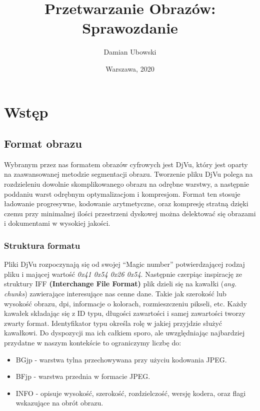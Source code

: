 \documentclass[a4paper,12pt]{book}
\title{\Large{\textbf{Przetwarzanie Obrazów: Sprawozdanie}}}
\author{
	Damian Ubowski
}
\date{Warszawa, 2020}
\begin{document}
\maketitle
\tableofcontents

\chapter{Wstęp}
\section{Format obrazu}
Wybranym przez nas formatem obrazów cyfrowych jest DjVu, który jest oparty na zaawansowanej metodzie segmentacji obrazu. Tworzenie pliku DjVu polega na rozdzieleniu dowolnie skomplikowanego obrazu na odrębne warstwy, a następnie poddaniu warst odrębnym optymalizacjom i kompresjom. Format ten stosuje ładowanie progresywne, kodowanie arytmetyczne, oraz kompresję stratną dzięki czemu przy minimalnej ilości przestrzeni dyskowej można delektować się obrazami i dokumentami w wysokiej jakości. 
\subsection{Struktura formatu}
Pliki DjVu rozpoczynają się od swojej ``Magic number'' potwierdzającej rodzaj pliku i mającej wartość \textit{0x41 0x54 0x26 0x54}. Następnie czerpiąc inspirację ze struktury IFF \textbf{(Interchange File Format)} plik dzieli się na kawałki (\textit{ang. chunks}) zawierające interesujące nas cenne dane. Takie jak szerokość lub wysokość obrazu, dpi, informacje o kolorach, rozmieszczeniu pikseli, etc. Każdy kawałek składając się z ID typu, długości zawartości i samej zawartości tworzy zwarty format. Identyfikator typu określa rolę w jakiej przyjdzie służyć kawałkowi. Do dyspozycji ma ich całkiem sporo, ale uwzględniając najbardziej przydatne w naszym kontekście to ograniczymy liczbę do: 
\renewcommand{\labelitemi}{$*$}
\begin{itemize}
	\item BGjp - warstwa tylna przechowywana przy użyciu kodowania JPEG. 
	\item BFjp - warstwa przednia w formacie JPEG. 
	\item INFO - opisuje wysokość, szerokość, rozdzielczość, wersję kodera, oraz flagi wskazujące na obrót obrazu. 
\end{itemize}
\end{document}
